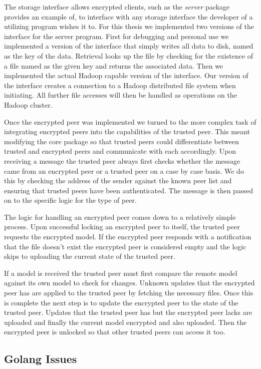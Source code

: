 The storage interface allows encrypted clients, such as the \emph{server} package provides an example of, to interface with any storage interface the developer of a utilizing program wishes it to.
For this thesis we implemented two versions of the interface for the server program.
First for debugging and personal use we implemented a version of the interface that simply writes all data to disk, named as the key of the data.
Retrieval looks up the file by checking for the existence of a file named as the given key and returns the associated data.
Then we implemented the actual Hadoop capable version of the interface.
Our version of the interface creates a connection to a Hadoop distributed file system when initiating.
All further file accesses will then be handled as operations on the Hadoop cluster.

Once the encrypted peer was implemented we turned to the more complex task of integrating encrypted peers into the capabilities of the trusted peer.
This meant modifying the core package so that trusted peers could differentiate between trusted and encrypted peers and communicate with each accordingly.
Upon receiving a message the trusted peer always first checks whether the message came from an encrypted peer or a trusted peer on a case by case basis.
We do this by checking the address of the sender against the known peer list and ensuring that trusted peers have been authenticated.
The message is then passed on to the specific logic for the type of peer.

The logic for handling an encrypted peer comes down to a relatively simple process.
Upon successful locking an encrypted peer to itself, the trusted peer requests the encrypted model.
If the encrypted peer responds with a notification that the file doesn't exist the encrypted peer is considered empty and the logic skips to uploading the current state of the trusted peer.

If a model is received the trusted peer must first compare the remote model against its own model to check for changes.
Unknown updates that the encrypted peer has are applied to the trusted peer by fetching the necessary files.
Once this is complete the next step is to update the encrypted peer to the state of the trusted peer.
Updates that the trusted peer has but the encrypted peer lacks are uploaded and finally the current model encrypted and also uploaded.
Then the encrypted peer is unlocked so that other trusted peers can access it too.

\subsection{Golang Issues}
\label{sub:Golang Issues}


